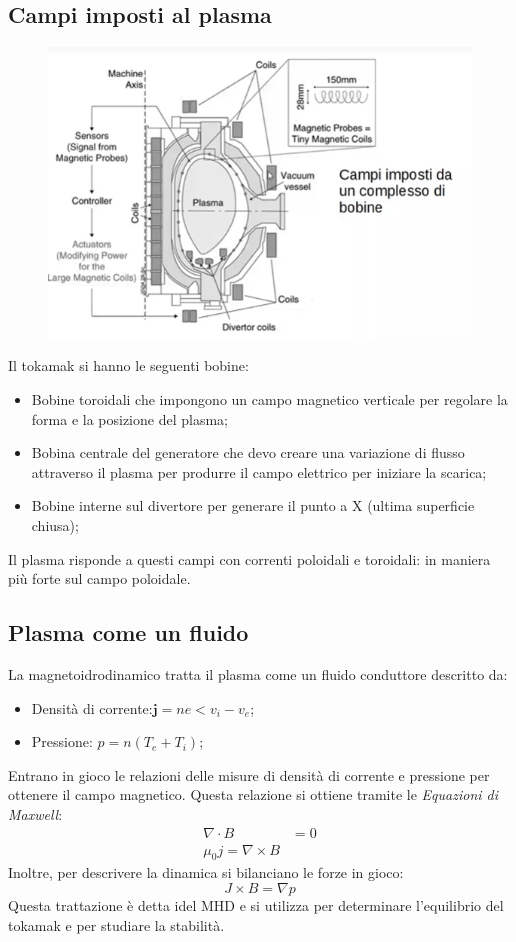 \documentclass{article}
\begin{document}
\subsection{Campi imposti al plasma}
\begin{center}
    \begin{figure}
        \centering
        \includegraphics[scale=0.4]{2022-06-26-14-59-14.png}%
    \end{figure}
\end{center}
Il tokamak si hanno le seguenti bobine:
\begin{itemize}
    \item Bobine toroidali che impongono un campo magnetico verticale per regolare la forma e la posizione del plasma;
    \item Bobina centrale del generatore che devo creare una variazione di flusso attraverso il plasma per produrre il campo elettrico per iniziare la scarica;
    \item Bobine interne sul divertore per generare il punto a X (ultima superficie chiusa);
\end{itemize}
Il plasma risponde a questi campi con correnti poloidali e toroidali: in maniera più forte sul campo poloidale.
\subsection{Plasma come un fluido}
La magnetoidrodinamico tratta il plasma come un fluido conduttore descritto da:
\begin{itemize}
    \item Densità di corrente:\(\mathbf{j}=ne<v_{i}-v_{e}\);
    \item Pressione: \(p=n(T_{e}+T_{i})\);
\end{itemize}
Entrano in gioco le relazioni delle misure di densità di corrente e pressione per ottenere il campo magnetico. Questa relazione si ottiene tramite le \emph{Equazioni di Maxwell}:\begin{align*}
    \nabla \cdot B&=0\\
    \mu_{0}j=\nabla\times B
\end{align*}
Inoltre, per descrivere la dinamica si bilanciano le forze in gioco:\begin{equation*}
    J\times B = \nabla p
\end{equation*}
Questa trattazione è detta idel MHD e si utilizza per determinare l'equilibrio del tokamak e per studiare la stabilità.
\end{document}
